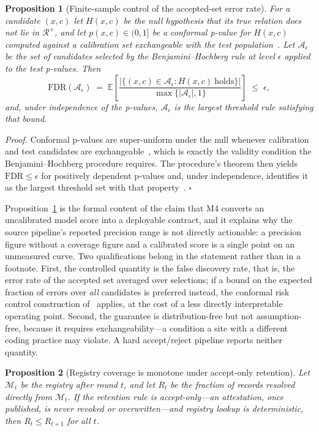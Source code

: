\documentclass[conference]{IEEEtran}
\newcommand{\reg}{\mathcal{M}}
\newcommand{\att}{\mathcal{A}}
\newtheorem{proposition}{Proposition}
\begin{document}
\begin{proposition}[Finite-sample control of the accepted-set error rate]
\label{prop:conformal}
For a candidate $(x,c)$ let $H(x,c)$ be the null hypothesis that its true relation does not lie in $\mathcal{R}^{+}$, and let $p(x,c) \in (0,1]$ be a conformal p-value for $H(x,c)$ computed against a calibration set exchangeable with the test population~\cite{b50,b52}. Let $\att_\epsilon$ be the set of candidates selected by the Benjamini--Hochberg rule at level $\epsilon$ applied to the test p-values. Then
\begin{equation}
\mathrm{FDR}(\att_\epsilon)
\;=\;
\mathbb{E}\!\left[
\frac{\big|\{(x,c) \in \att_\epsilon : H(x,c)\ \text{holds}\}\big|}{\max\{|\att_\epsilon|,1\}}
\right]
\;\le\; \epsilon ,
\end{equation}
and, under independence of the p-values, $\att_\epsilon$ is the largest threshold rule satisfying that bound.
\end{proposition}

\noindent\textit{Proof.} Conformal p-values are super-uniform under the null whenever calibration and test candidates are exchangeable~\cite{b50}, which is exactly the validity condition the Benjamini--Hochberg procedure requires. The procedure's theorem then yields $\mathrm{FDR} \le \epsilon$ for positively dependent p-values and, under independence, identifies it as the largest threshold set with that property~\cite{b53}. \hfill$\square$

Proposition~\ref{prop:conformal} is the formal content of the claim that M4 converts an uncalibrated model score into a deployable contract, and it explains why the source pipeline's reported precision range is not directly actionable: a precision figure without a coverage figure and a calibrated score is a single point on an unmeasured curve. Two qualifications belong in the statement rather than in a footnote. First, the controlled quantity is the false discovery rate, that is, the error rate of the accepted set averaged over selections; if a bound on the expected fraction of errors over \emph{all} candidates is preferred instead, the conformal risk control construction of~\cite{b22} applies, at the cost of a less directly interpretable operating point. Second, the guarantee is distribution-free but not assumption-free, because it requires exchangeability---a condition a site with a different coding practice may violate. A hard accept/reject pipeline reports neither quantity.

\begin{proposition}[Registry coverage is monotone under accept-only retention]
\label{prop:registry}
Let $\reg_t$ be the registry after round $t$, and let $R_t$ be the fraction of records resolved directly from $\reg_t$. If the retention rule is accept-only---an attestation, once published, is never revoked or overwritten---and registry lookup is deterministic, then $R_t \le R_{t+1}$ for all $t$.
\end{proposition}
\end{document}
